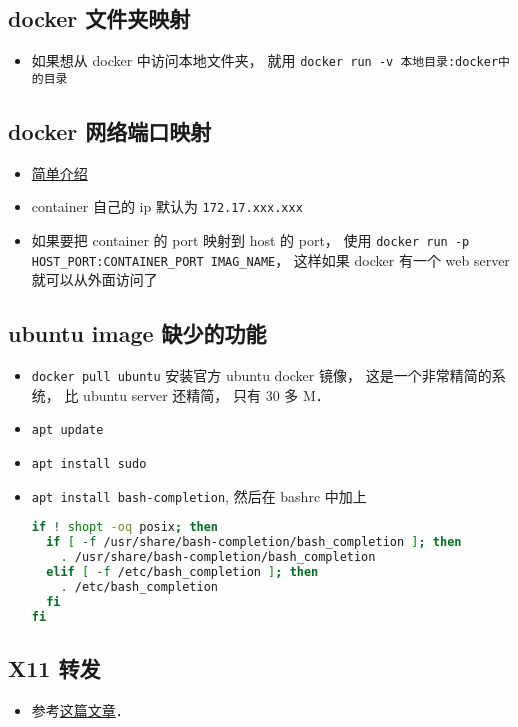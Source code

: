 \subsection{docker 文件夹映射}
\begin{itemize}
\item 如果想从 docker 中访问本地文件夹， 就用 \verb|docker run -v 本地目录:docker中的目录|
\end{itemize}

\subsection{docker 网络端口映射}
\begin{itemize}
\item \href{https://www.freecodecamp.org/news/how-to-get-a-docker-container-ip-address-explained-with-examples/}{简单介绍}
\item container 自己的 ip 默认为 \verb`172.17.xxx.xxx`
\item 如果要把 container 的 port 映射到 host 的 port， 使用 \verb`docker run -p HOST_PORT:CONTAINER_PORT IMAG_NAME`， 这样如果 docker 有一个 web server 就可以从外面访问了
\end{itemize}

\subsection{ubuntu image 缺少的功能}
\begin{itemize}
\item \verb|docker pull ubuntu| 安装官方 ubuntu docker 镜像， 这是一个非常精简的系统， 比 ubuntu server 还精简， 只有 30 多 M．
\item \verb|apt update|
\item \verb`apt install sudo`
\item \verb`apt install bash-completion`, 然后在 bashrc 中加上
\begin{lstlisting}[language=bash]
if ! shopt -oq posix; then
  if [ -f /usr/share/bash-completion/bash_completion ]; then
    . /usr/share/bash-completion/bash_completion
  elif [ -f /etc/bash_completion ]; then
    . /etc/bash_completion
  fi
fi
\end{lstlisting}
\end{itemize}

\subsection{X11 转发}
\begin{itemize}
\item 参考\href{https://opendata-forum.cern.ch/t/x11-forwarding-with-docker/31}{这篇文章}．
\end{itemize}
